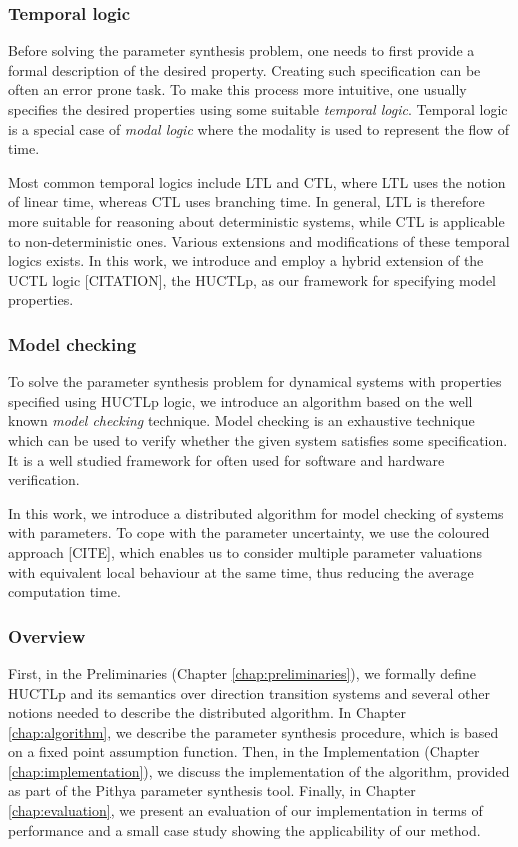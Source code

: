 \subsubsection{\textbf{Temporal logic}}

Before solving the parameter synthesis problem, one needs to first provide a formal description of the desired property. Creating such specification can be often an error prone task. To make this process more intuitive, one usually specifies the desired properties using some suitable \emph{temporal logic}. Temporal logic is a special case of \emph{modal logic} where the modality is used to represent the flow of time.

Most common temporal logics include \acf{LTL} and \acf{CTL}, where \ac{LTL} uses the notion of linear time, whereas \ac{CTL} uses branching time. In general, \ac{LTL} is therefore more suitable for reasoning about deterministic systems, while \ac{CTL} is applicable to non-deterministic ones. Various extensions and modifications of these temporal logics exists. In this work, we introduce and employ a hybrid extension of the UCTL logic [CITATION], the \acf{HUCTLp}, as our framework for specifying model properties.

\subsubsection{\textbf{Model checking}}

To solve the parameter synthesis problem for dynamical systems with properties specified using \ac{HUCTLp} logic, we introduce an algorithm based on the well known \emph{model checking} technique. Model checking is an exhaustive technique which can be used to verify whether the given system satisfies some specification. It is a well studied framework for often used for software and hardware verification.

In this work, we introduce a distributed algorithm for model checking of systems with parameters. To cope with the parameter uncertainty, we use the coloured approach [CITE], which enables us to consider multiple parameter valuations with equivalent local behaviour at the same time, thus reducing the average computation time.

\subsubsection{\textbf{Overview}}
 
First, in the Preliminaries (Chapter \ref{chap:preliminaries}), we formally define \ac{HUCTLp} and its semantics over direction transition systems and several other notions needed to describe the distributed algorithm. In Chapter \ref{chap:algorithm}, we describe the parameter synthesis procedure, which is based on a fixed point assumption function. Then, in the Implementation (Chapter \ref{chap:implementation}), we discuss the implementation of the algorithm, provided as part of the Pithya parameter synthesis tool. Finally, in Chapter \ref{chap:evaluation}, we present an evaluation of our implementation in terms of performance and a small case study showing the applicability of our method. 

